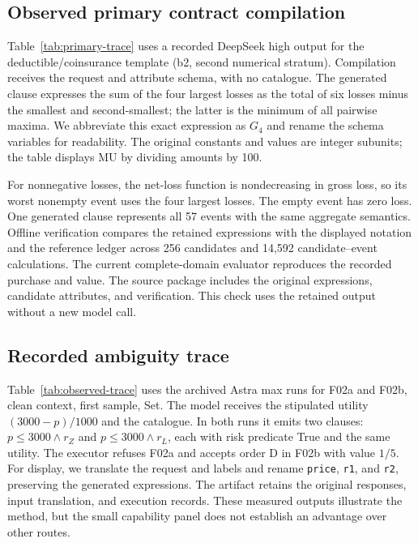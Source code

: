 \subsection{Observed primary contract compilation}
\label{app:primary-trace}
Table~\ref{tab:primary-trace} uses a recorded DeepSeek high output for the deductible/coinsurance template (b2, second numerical stratum). Compilation receives the request and attribute schema, with no catalogue. The generated clause expresses the sum of the four largest losses as the total of six losses minus the smallest and second-smallest; the latter is the minimum of all pairwise maxima. We abbreviate this exact expression as $G_4$ and rename the schema variables for readability. The original constants and values are integer subunits; the table displays MU by dividing amounts by 100.

For nonnegative losses, the net-loss function is nondecreasing in gross loss, so its worst nonempty event uses the four largest losses. The empty event has zero loss. One generated clause represents all 57 events with the same aggregate semantics. Offline verification compares the retained expressions with the displayed notation and the reference ledger across 256 candidates and 14,592 candidate--event calculations. The current complete-domain evaluator reproduces the recorded purchase and value. The source package includes the original expressions, candidate attributes, and verification. This check uses the retained output without a new model call.

\subsection{Recorded ambiguity trace}
\label{app:observed-trace}
Table~\ref{tab:observed-trace} uses the archived Astra max runs for F02a and F02b, clean context, first sample, Set. The model receives the stipulated utility $(3000-p)/1000$ and the catalogue. In both runs it emits two clauses: $p\le3000\wedge r_Z$ and $p\le3000\wedge r_L$, each with risk predicate True and the same utility. The executor refuses F02a and accepts order D in F02b with value $1/5$. For display, we translate the request and labels and rename \texttt{price}, \texttt{r1}, and \texttt{r2}, preserving the generated expressions. The artifact retains the original responses, input translation, and execution records. These measured outputs illustrate the method, but the small capability panel does not establish an advantage over other routes.

